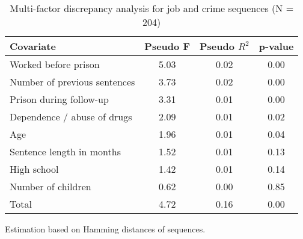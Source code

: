 \begin{table}[htp]
\footnotesize
\setlength{\tabcolsep}{10pt}
\renewcommand{\arraystretch}{1.3}
\begin{threeparttable}
\centering
\caption{Multi-factor discrepancy analysis for job and crime sequences (N = 204)} 
\label{tab:discrepancy_job_crime}
\begin{tabular}{lccc}
  \hline
Covariate & Pseudo F & Pseudo $R^2$ & p-value \\ 
  \hline
Worked before prison & 5.03 & 0.02 & 0.00 \\ 
  Number of previous sentences & 3.73 & 0.02 & 0.00 \\ 
  Prison during follow-up & 3.31 & 0.01 & 0.00 \\ 
  Dependence / abuse of drugs & 2.09 & 0.01 & 0.02 \\ 
  Age & 1.96 & 0.01 & 0.04 \\ 
  Sentence length in months & 1.52 & 0.01 & 0.13 \\ 
  High school & 1.42 & 0.01 & 0.14 \\ 
  Number of children & 0.62 & 0.00 & 0.85 \\ 
  Total & 4.72 & 0.16 & 0.00 \\ 
   \hline
\end{tabular}
\begin{tablenotes}
\scriptsize
\item Estimation based on Hamming distances of sequences.
\end{tablenotes}
\end{threeparttable}
\end{table}
